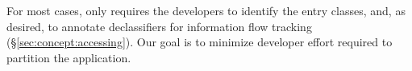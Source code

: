 
For most cases, \sysname{} only requires the developers
to identify the entry classes, and, as desired, to annotate declassifiers for information flow tracking (\S\ref{sec:concept:accessing}).
Our goal is to minimize developer effort required to partition the application.







